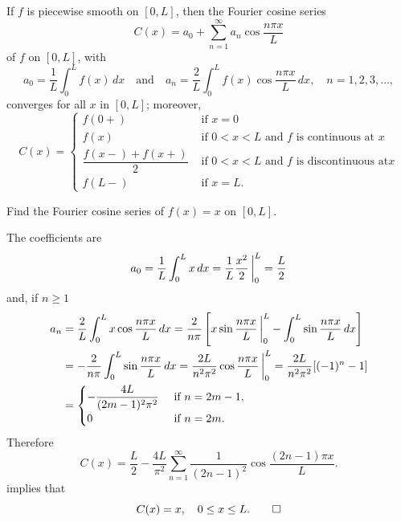 \begin{theorem}\label{thmtype:11.3.1}
If $f$ is piecewise smooth on $[0,L]$, then the Fourier cosine series
\[
C(x)=a_0+\sum_{n=1}^\infty a_n\cos\frac{n\pi x}{L}
\]
of $f$
on $[0,L]$,
with
\[
a_0=\frac{1}{L}\int_0^Lf(x)\,dx
\quad\text{and}\quad
a_n=\frac{2}{L}\int_0^Lf(x)\cos\frac{n\pi x}{L}\,dx,\quad n=1,2,3,\dots,
\]
 converges for all $x$ in $[0,L]$; moreover,
\[
C(x)=
\begin{cases}
f(0+)&\text{ if }x=0  \\
f(x)&\text{ if $0<x<L$ and $f$ is continuous at $x  $}\\
\dfrac{f(x-)+f(x+)}{2}&\text{ if $0<x<L$ and $f$ is discontinuous at
$x  $}\\
f(L-)&\text{ if }x=L.
\end{cases}
\]
\end{theorem}

\begin{example}\label{example:11.3.1}
Find the Fourier cosine series of $f(x)=x$ on $[0,L]$.
\end{example}

\begin{solution}
 The coefficients are
\[
a_0=\frac{1}{L}\int_0^Lx\,dx=\frac{1}{L}\frac{x^2}{2}
\,\bigg|_{0}^{L}=\frac{L}{2}
\]
and, if $n\ge1$
\begin{align*}
a_n&=\frac{2}{L}\int_0^Lx\cos\frac{n\pi x}{L}\,dx
=\frac{2}{n\pi}\left[x\sin\frac{n\pi x}{L}\,\bigg|_{0}^{L}-
\int_0^L
\sin\frac{n\pi x}{L}\,dx\right]\\
&=-\frac{2}{n\pi}\int_0^L
\sin\frac{n\pi x}{L}\,dx
=\frac{2L}{n^2\pi^2}\cos\frac{n\pi x}{L}\,\bigg|_{0}^{L}
=\frac{2L}{n^2\pi^2}[(-1)^n-1]\\
&=\begin{cases}
\displaystyle-\frac{4L}{(2m-1)^2\pi^2}&\text{ if  $n=2m-1$},\\
0&\text{ if $n=2m$}.
\end{cases}
\end{align*}
Therefore
\[
C(x)=\frac{L}{2}-\frac{4L}{\pi^2}\sum_{n=1}^\infty\frac{1}{(2n-1)^2}
\cos\frac{(2n-1)\pi x}{L}.
\]
 implies that
\[
C(x)=x,\quad 0\le x\le L.\qedhere
\]
\end{solution}



